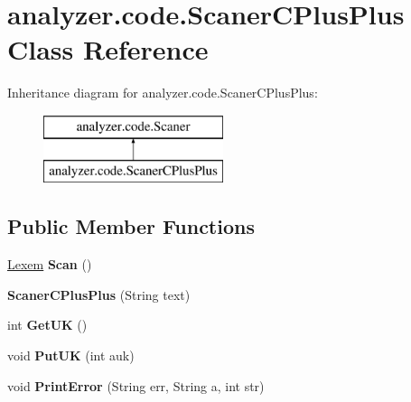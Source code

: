 \hypertarget{classanalyzer_1_1code_1_1ScanerCPlusPlus}{}\section{analyzer.\+code.\+Scaner\+C\+Plus\+Plus Class Reference}
\label{classanalyzer_1_1code_1_1ScanerCPlusPlus}
Inheritance diagram for analyzer.\+code.\+Scaner\+C\+Plus\+Plus\+:\begin{figure}[H]
\begin{center}
\leavevmode
\includegraphics[height=2.000000cm]{classanalyzer_1_1code_1_1ScanerCPlusPlus}
\end{center}
\end{figure}
\subsection*{Public Member Functions}
\begin{DoxyCompactItemize}
\item 
\mbox{\label{classanalyzer_1_1code_1_1ScanerCPlusPlus_a8e206ebf05aeda8102ed5993e8e699c4}} 
\hyperlink{classanalyzer_1_1code_1_1Lexem}{Lexem} {\bfseries Scan} ()
\item 
\mbox{\label{classanalyzer_1_1code_1_1ScanerCPlusPlus_a7920424438e26e69853c7486051e6f7b}} 
{\bfseries Scaner\+C\+Plus\+Plus} (String text)
\item 
\mbox{\label{classanalyzer_1_1code_1_1ScanerCPlusPlus_a0723d812bda76c14824fcce55059e662}} 
int {\bfseries Get\+UK} ()
\item 
\mbox{\label{classanalyzer_1_1code_1_1ScanerCPlusPlus_aa3d7eaf52f3523a16726bded0428d124}} 
void {\bfseries Put\+UK} (int auk)
\item 
\mbox{\label{classanalyzer_1_1code_1_1ScanerCPlusPlus_a4368151d61a92ae270dbe119bab21ef6}} 
void {\bfseries Print\+Error} (String err, String a, int str)
\end{DoxyCompactItemize}
